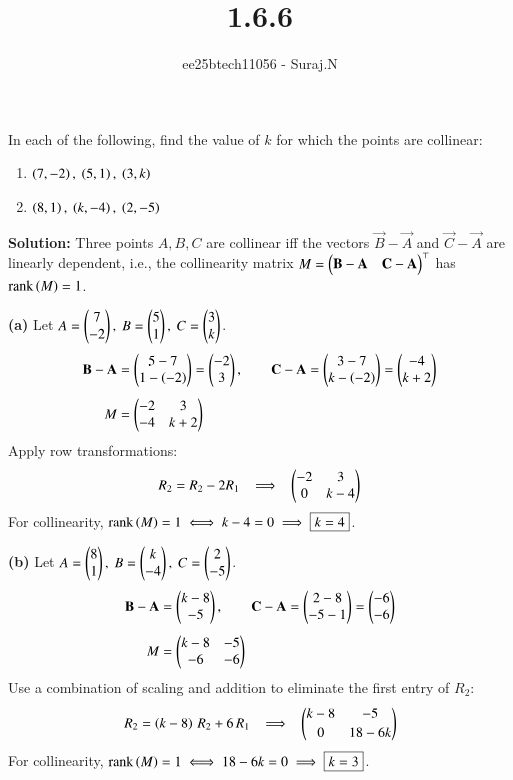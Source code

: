 \documentclass[journal,12pt,onecolumn]{IEEEtran}
\theoremstyle{remark}
\begin{document}
\title{1.6.6}
\author{ee25btech11056 - Suraj.N}
\maketitle
\renewcommand{\thefigure}{\theenumi}
\renewcommand{\thetable}{\theenumi}

\item In each of the following, find the value of $k$ for which the points are collinear:
\begin{enumerate}
\item $\brak{7,-2},\ \brak{5,1},\ \brak{3,k}$
\item $\brak{8,1},\ \brak{k,-4},\ \brak{2,-5}$
\end{enumerate}

\textbf{Solution:} Three points $A, B, C$ are collinear iff the vectors $\vec{B}-\vec{A}$ and $\vec{C}-\vec{A}$ are linearly dependent, i.e., the collinearity matrix
\(
M=\begin{pmatrix} \mathbf{B}-\mathbf{A} & \mathbf{C}-\mathbf{A} \end{pmatrix}^\top
\)
has $\operatorname{rank}\left(M\right)=1$.

\textbf{(a)} Let $A=\myvec{7\\-2},\ B=\myvec{5\\1},\ C=\myvec{3\\k}$.
\begin{align*}
\mathbf{B}-\mathbf{A}&=\begin{pmatrix}5-7\\1-\left(-2\right)\end{pmatrix}=\begin{pmatrix}-2\\3\end{pmatrix},\qquad
\mathbf{C}-\mathbf{A}=\begin{pmatrix}3-7\\k-\left(-2\right)\end{pmatrix}=\begin{pmatrix}-4\\k+2\end{pmatrix}\\[4pt]
M&=\begin{pmatrix}-2 & 3\\ -4 & k+2\end{pmatrix}
\end{align*}
Apply row transformations:
\begin{align*}
R_2 = R_2 - 2R_1
\;\;\implies\;\;
\begin{pmatrix}-2 & 3\\ 0 & k-4\end{pmatrix}
\end{align*}
For collinearity, $\operatorname{rank}\left(M\right)=1 \iff k-4=0 \implies \boxed{k=4}$.

\textbf{(b)} Let $A=\myvec{8\\1},\ B=\myvec{k\\-4},\ C=\myvec{2\\-5}$.
\begin{align*}
\mathbf{B}-\mathbf{A}&=\begin{pmatrix}k-8\\-5\end{pmatrix},\qquad
\mathbf{C}-\mathbf{A}=\begin{pmatrix}2-8\\-5-1\end{pmatrix}=\begin{pmatrix}-6\\-6\end{pmatrix}\\[4pt]
M&=\begin{pmatrix}k-8 & -5\\ -6 & -6\end{pmatrix}
\end{align*}
Use a combination of scaling and addition to eliminate the first entry of $R_2$:
\begin{align*}
R_2 = \left(k-8\right)\,R_2 + 6\,R_1
\;\;\implies\;\;
\begin{pmatrix}k-8 & -5\\[2pt] 0 & 18-6k\end{pmatrix}
\end{align*}
For collinearity, $\operatorname{rank}\left(M\right)=1 \iff 18-6k=0 \implies \boxed{k=3}$.
\end{document}

